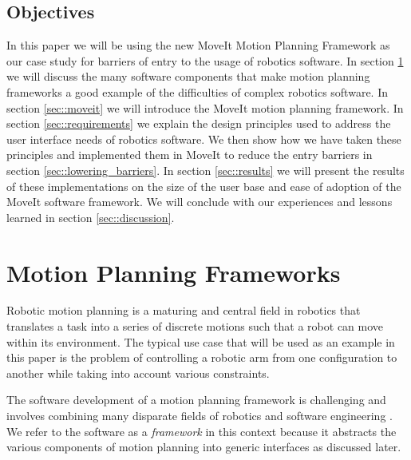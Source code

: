 \documentclass[10pt,journal,compsoc]{joser1}
\begin{document}
{\subsection{Objectives}

In this paper we will be using the new MoveIt Motion Planning Framework as our case study for barriers of entry to the usage of robotics software. In section \ref{sec::motion_planning} we will discuss the many software components that make motion planning frameworks a good example of the difficulties of complex robotics software. In section \ref{sec::moveit} we will introduce the MoveIt motion planning framework. In section \ref{sec::requirements} we explain the design principles used to address the user interface needs of robotics software. We then show how we have taken these principles and implemented them in MoveIt to reduce the entry barriers in section \ref{sec::lowering_barriers}. In section \ref{sec::results} we will present the results of these implementations on the size of the user base and ease of adoption of the MoveIt software framework. We will conclude with our experiences and lessons learned in section \ref{sec::discussion}.

\section{Motion Planning Frameworks}
\label{sec::motion_planning}

Robotic motion planning is a maturing and central field in robotics \cite{moll2011teaching} that translates a task into a series of discrete motions such that a robot can move within its environment. The typical use case that will be used as an example in this paper is the problem of controlling a robotic arm from one configuration to another while taking into account various constraints.

The software development of a motion planning framework is challenging and involves combining many disparate fields of robotics and software engineering \cite{perez2010roadmap}. We refer to the software as a \textit{framework} in this context because it abstracts the various components of motion planning into generic interfaces as discussed later.

}
\end{document}
